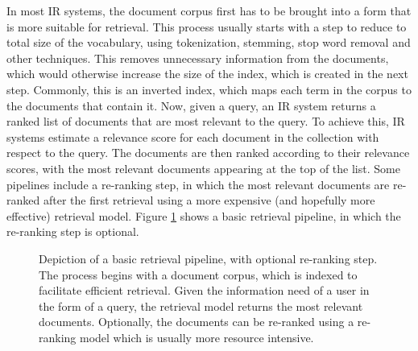 In most IR systems, the document corpus first has to be brought into a form that is more suitable for retrieval.
This process usually starts with a step to reduce to total size of the vocabulary, using tokenization, stemming, stop word removal and other techniques.
This removes unnecessary information from the documents, which would otherwise increase the size of the index, which is created in the next step.
Commonly, this is an inverted index, which maps each term in the corpus to the documents that contain it.
Now, given a query, an IR system returns a ranked list of documents that are most relevant to the query.
To achieve this, IR systems estimate a relevance score for each document in the collection with respect to the query.
The documents are then ranked according to their relevance scores, with the most relevant documents appearing at the top of the list.
Some pipelines include a re-ranking step, in which the most relevant documents are re-ranked after the first retrieval using a more expensive (and hopefully more effective) retrieval model.
Figure \ref{fig:reranking_pipeline} shows a basic retrieval pipeline, in which the re-ranking step is optional.
\begin{figure}[tb]
\centering
{}
\caption{Depiction of a basic retrieval pipeline, with optional re-ranking step. The process begins with a document corpus, which is indexed to facilitate efficient retrieval. Given the information need of a user in the form of a query, the retrieval model returns the most relevant documents. Optionally, the documents can be re-ranked using a re-ranking model which is usually more resource intensive.}
\label{fig:reranking_pipeline}
\end{figure}

